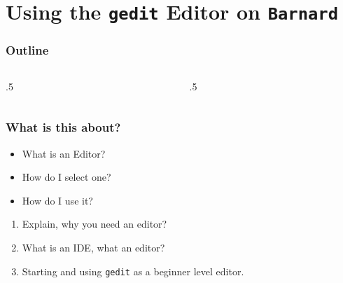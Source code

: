 \section{Using the \texttt{gedit} Editor on \texttt{Barnard}}

\ifdefined\ishandout
{
	\frame{
		\tableofcontents[currentsection]
	}
}
\else
\begin{frame}
	\frametitle{Outline}
	\begin{columns}[t]
		\begin{column}{.5\textwidth}
			\tableofcontents[sections={1-9},currentsection]
		\end{column}
		\begin{column}{.5\textwidth}
			\tableofcontents[sections={10-18},currentsection]
		\end{column}
	\end{columns}
\end{frame}
\fi

\begin{frame}
	\frametitle{What is this about?}
	\begin{question}[Questions]\begin{itemize}
			\item What is an Editor?
			\item How do I select one?
			\item How do I use it?
		\end{itemize}
	\end{question}
	\begin{docs}[Objectives]
		\begin{enumerate}
			\item Explain, why you need an editor?
			\item What is an IDE, what an editor?
			\item Starting and using \texttt{gedit} as a beginner level editor.
		\end{enumerate}
	\end{docs}
\end{frame}

